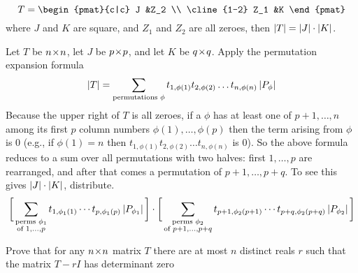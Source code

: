 \begin{exercises}
    \begin{equation*}
      T=
      \begin{pmat}{c|c}
          J   &Z_2  \\  \cline{1-2}
          Z_1 &K
       \end{pmat}
    \end{equation*}
    where $J$ and $K$ are square, and $Z_1$ and $Z_2$ are all zeroes,
    then \( \deter{T}=\deter{J}\cdot\deter{K} \).
    \begin{answer}
      Let \( T \) be \( n \! \times \! n \),
      let \( J \) be \( p \! \times \! p \),
      and let \( K \) be \( q \! \times \! q \).
      Apply the permutation expansion formula
      \begin{equation*}
        \deter{T}=
        \sum_{\text{\scriptsize permutations }\phi}
                t_{1,\phi(1)}t_{2,\phi(2)}\dots t_{n,\phi(n)}
                \deter{P_{\phi}}
      \end{equation*}
      Because the upper right of \( T \) is all zeroes, if a
      \( \phi \) has at least one of \( p+1,\dots,n \) among its first
      \( p \) column numbers \( \phi(1),\dots,\phi(p) \) then the term arising
      from \( \phi \) is \( 0 \)
      (e.g., if \( \phi(1)=n \) then
      \( t_{1,\phi(1)}t_{2,\phi(2)}\dots t_{n,\phi(n)} \)
      is \( 0 \)).
      So the above formula reduces to a sum over all permutations
      with two halves:
      first \( 1,\dots,p \) are rearranged, and after that comes
      a permutation of
      \( p+1,\dots,p+q \).
      To see this gives \( \deter{J}\cdot\deter{K}  \), distribute.
      \begin{equation*}
         \bigg[\sum_{\substack{\text{\scriptsize perms }\phi_1 \\
                              \text{\scriptsize of } 1,\dots,p}}
               t_{1,\phi_1(1)}\cdots t_{p,\phi_1(p)} 
               \deter{P_{\phi_1}}                            \bigg]\cdot
         \bigg[\sum_{\substack{\text{\scriptsize perms }\phi_2 \\
                              \text{\scriptsize of } p+1,\dots,p+q}}
               t_{p+1,\phi_2(p+1)}\cdots t_{p+q,\phi_2(p+q)} 
               \deter{P_{\phi_2}}                          \bigg]
      \end{equation*}  
    \end{answer}
  \recommended \item
    Prove that for any \( n \! \times \! n \) matrix \( T \) there are at most
    \( n \) distinct reals \( r \) such that the matrix \( T-rI \) has
    determinant zero

\end{exercises}
